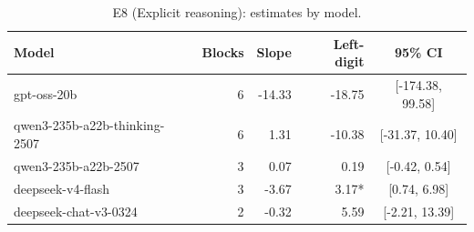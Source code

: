 \begin{table}[t]
\centering
\caption{E8 (Explicit reasoning): estimates by model.}
\label{tab:e8model}
\small
\begin{tabular}{lrrrc}
\toprule
Model & Blocks & Slope & Left-digit & 95\% CI \\
\midrule
gpt-oss-20b & 6 & -14.33 & -18.75 & [-174.38, 99.58] \\
qwen3-235b-a22b-thinking-2507 & 6 & 1.31 & -10.38 & [-31.37, 10.40] \\
qwen3-235b-a22b-2507 & 3 & 0.07 & 0.19 & [-0.42, 0.54] \\
deepseek-v4-flash & 3 & -3.67 & 3.17* & [0.74, 6.98] \\
deepseek-chat-v3-0324 & 2 & -0.32 & 5.59 & [-2.21, 13.39] \\
\bottomrule
\end{tabular}
\end{table}
